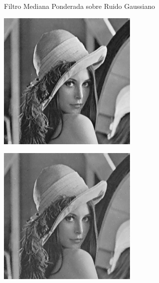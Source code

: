\documentclass{beamer}
\begin{document}
\begin{frame}[fragile]{Filtro Mediana Ponderada sobre Ruido Gaussiano}
	\begin{minipage}{0.25\linewidth}
		\centering
		\includegraphics[width=\linewidth]{../results/lena_gauss_sigma10_mediana_ponderada}
	\end{minipage}\hfill
	\begin{minipage}{0.25\linewidth}
		\centering
		\includegraphics[width=\linewidth]{../results/lena_gauss_sigma20_mediana_ponderada}

\end{minipage}
\end{frame}
\end{document}

